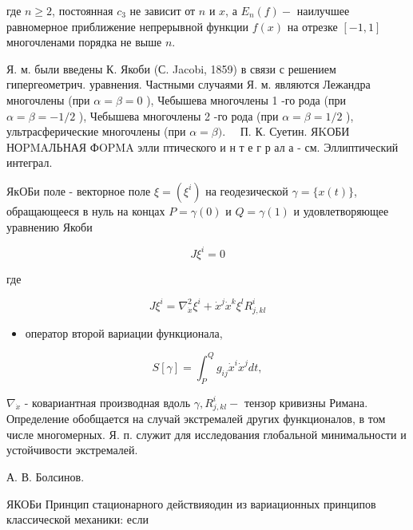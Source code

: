 \documentclass[10pt]{article}
\begin{document}
где $n \geqslant 2$, постоянная $c_{3}$ не зависит от $n$ и $x$, а $E_{n}(f)-$ наилучшее равномерное приближение непрерывной функции $f(x)$ на отрезке $[-1,1]$ многочленами порядка не выше $n$.



Я. м. были введены К. Якоби (С. Jacobi, 1859) в связи с решением гипергеометрич. уравнения. Частными случаями Я. м. являются Лежандра многочлены (при $\alpha=\beta=0$ ), Чебышева многочлены 1 -го рода (при $\alpha=\beta=-1 / 2$ ), Чебышева многочлены 2 -го рода (при $\alpha=\beta=1 / 2$ ), ультрасферические многочлены (при $\alpha=\beta) . \quad$ П. К. Суетин. ЯKОБИ НОPMAЛЬНАЯ ФOPMA элли птического и н т е г р ал а - см. Эллиптический интеграл.



ЯкОБи поле - векторное поле $\xi=\left(\xi^{i}\right)$ на геодезической $\gamma=\{x(t)\}$, обращающееся в нуль на концах $P=\gamma(0)$ и $Q=\gamma(1)$ и удовлетворяющее уравнению Якоби



\[

J \xi^{i}=0

\]



где



\[

J \xi^{i}=\nabla_{\dot{x}}^{2} \xi^{i}+\dot{x}^{j} \dot{x}^{k} \xi^{l} R_{j, k l}^{i}

\]



\begin{itemize}

  \item оператор второй вариации функционала,

\end{itemize}



\[

S[\gamma]=\int_{P}^{Q} g_{i j} \dot{x}^{i} \dot{x}^{j} d t,

\]



$\nabla_{\dot{x}}$ - ковариантная производная вдоль $\gamma, R_{j, k l}^{i}-$ тензор кривизны Римана. Определение обобщается на случай экстремалей других функционалов, в том числе многомерных. Я. п. служит для исследования глобальной минимальности и устойчивости экстремалей.



А. В. Болсинов.



ЯКОБи Принцип стационарного действияодин из вариационных принципов классической механики: если
\end{document}
